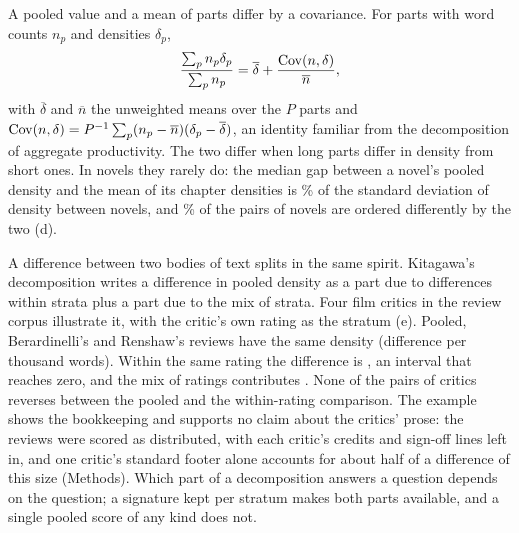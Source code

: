 A pooled value and a mean of parts differ by a covariance. For parts with word counts $n_p$ and densities $\delta_p$,
\begin{equation}
\frac{\sum_p n_p\delta_p}{\sum_p n_p}=\overline{\delta}+\frac{\operatorname{Cov}(n,\delta)}{\overline{n}},
\label{eq:pooled}
\end{equation}
with $\overline{\delta}$ and $\overline{n}$ the unweighted means over the $P$ parts and $\operatorname{Cov}(n,\delta)=P^{-1}\sum_p(n_p-\overline{n})(\delta_p-\overline{\delta})$, an identity familiar from the decomposition of aggregate productivity\cite{olley1996}. The two differ when long parts differ in density from short ones. In novels they rarely do: the median gap between a novel's pooled density and the mean of its chapter densities is \gapOverSd\% of the standard deviation of density between novels, and \pairFlip\% of the \nPairs{} pairs of novels are ordered differently by the two (d).

A difference between two bodies of text splits in the same spirit. Kitagawa's decomposition\cite{kitagawa1955} writes a difference in pooled density as a part due to differences within strata plus a part due to the mix of strata. Four film critics in the review corpus\cite{pang2005} illustrate it, with the critic's own rating as the stratum (e). Pooled, Berardinelli's and Renshaw's reviews have the same density (difference \critBerRenTotal{} per thousand words). Within the same rating the difference is \critBerRenWithin, an interval that reaches zero, and the mix of ratings contributes \critBerRenMix. None of the \critPairs{} pairs of critics reverses between the pooled and the within-rating comparison. The example shows the bookkeeping and supports no claim about the critics' prose: the reviews were scored as distributed, with each critic's credits and sign-off lines left in, and one critic's standard footer alone accounts for about half of a difference of this size (Methods). Which part of a decomposition answers a question depends on the question\cite{pearl2014}; a signature kept per stratum makes both parts available, and a single pooled score of any kind does not.


\figAggregation
